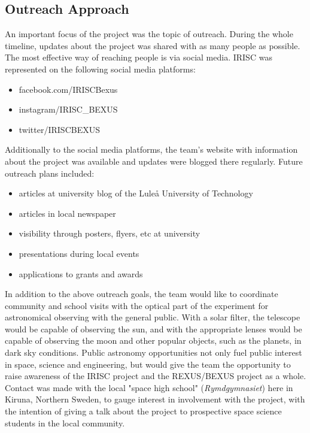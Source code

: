 
\subsection{Outreach Approach}
An important focus of the project was the topic of outreach. During the whole timeline, updates about the project was shared with as many people as possible. The most effective way of reaching people is via social media. IRISC was represented on the following social media platforms:
\begin{itemize}
	\item facebook.com/IRISCBexus
	\item instagram/IRISC\_BEXUS
	\item twitter/IRISCBEXUS
\end{itemize}
Additionally to the social media platforms, the team's website with information about the project was available and updates were blogged there regularly.\newline\newline
Future outreach plans included:
\begin{itemize}
	\item articles at university blog of the Lule{\aa} University of Technology
	\item articles in local newspaper
	\item visibility through posters, flyers, etc at university
	\item presentations during local events
	\item applications to grants and awards
\end{itemize}

In addition to the above outreach goals, the team would like to coordinate community and school visits with the optical part of the experiment for astronomical observing with the general public. With a solar filter, the telescope would be capable of observing the sun, and with the appropriate lenses would be capable of observing the moon and other popular objects, such as the planets, in dark sky conditions. Public astronomy opportunities not only fuel public interest in space, science and engineering, but would give the team the opportunity to raise awareness of the IRISC project and the REXUS/BEXUS project as a whole.\\
Contact was made with the local "space high school" (\textit{Rymdgymnasiet}) here in Kiruna, Northern Sweden, to gauge interest in involvement with the project, with the intention of giving a talk about the project to prospective space science students in the local community.